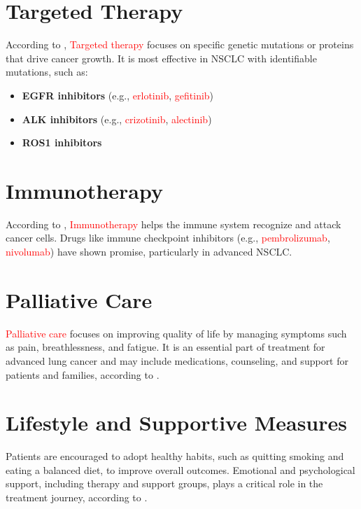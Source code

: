 \section{Targeted Therapy}
According to \cite{mayekar2017current}, \textcolor{red}{Targeted therapy} focuses on specific genetic mutations or proteins that drive cancer growth. It is most effective in NSCLC with identifiable mutations, such as: 
\begin{highlight}
\begin{itemize}
    \item \textbf{EGFR inhibitors} (e.g., \textcolor{red}{erlotinib}, \textcolor{red}{gefitinib})
    \item \textbf{ALK inhibitors} (e.g., \textcolor{red}{crizotinib}, \textcolor{red}{alectinib})
    \item \textbf{ROS1 inhibitors}
\end{itemize}
\end{highlight}

\section{Immunotherapy}
\begin{outline}
According to \cite{steven2016immunotherapy}, \textcolor{red}{Immunotherapy} helps the immune system recognize and attack cancer cells. Drugs like immune checkpoint inhibitors (e.g., \textcolor{red}{pembrolizumab}, \textcolor{red}{nivolumab}) have shown promise, particularly in advanced NSCLC.
\end{outline}

\section{Palliative Care}
\begin{outline}
\textcolor{red}{Palliative care} focuses on improving quality of life by managing symptoms such as pain, breathlessness, and fatigue. It is an essential part of treatment for advanced lung cancer and may include medications, counseling, and support for patients and families, according to \cite{ferrell2011palliative}.
\end{outline}

\section{Lifestyle and Supportive Measures}
\begin{outline}
Patients are encouraged to adopt healthy habits, such as quitting smoking and eating a balanced diet, to improve overall outcomes. Emotional and psychological support, including therapy and support groups, plays a critical role in the treatment journey, according to \cite{heredia2023effectiveness}.
\end{outline}

